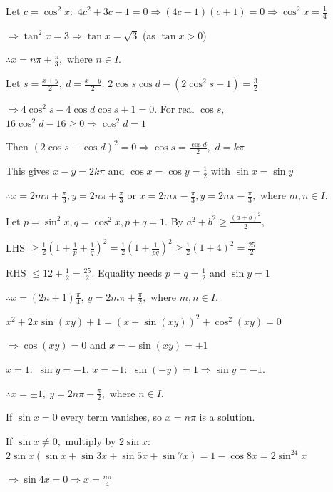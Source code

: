   Let $c = \cos^2x:$ $4c^2 + 3c - 1 = 0 \Rightarrow (4c - 1)(c + 1) = 0 \Rightarrow \cos^2x = \frac{1}{4}$

  $\Rightarrow \tan^2x = 3 \Rightarrow \tan x = \sqrt{3}$ (as $\tan x > 0$)

  $\therefore x = n\pi + \frac{\pi}{3},$ where $n\in I.$

\item Let $s = \frac{x + y}{2},~d = \frac{x - y}{2}.$ $2\cos s\cos d - (2\cos^2s - 1) = \frac{3}{2}$

  $\Rightarrow 4\cos^2s - 4\cos d\cos s + 1 = 0.$ For real $\cos s,$ $16\cos^2d - 16\geq 0\Rightarrow \cos^2d = 1$

  Then $(2\cos s - \cos d)^2 = 0 \Rightarrow \cos s = \frac{\cos d}{2},$ $d = k\pi$

  This gives $x - y = 2k\pi$ and $\cos x = \cos y = \frac{1}{2}$ with $\sin x = \sin y$

  $\therefore x = 2m\pi + \frac{\pi}{3}, y = 2n\pi + \frac{\pi}{3}$ or $x = 2m\pi - \frac{\pi}{3}, y = 2n\pi -
  \frac{\pi}{3},$ where $m, n\in I.$

\item Let $p = \sin^2x, q = \cos^2x, p + q = 1.$ By $a^2 + b^2\geq\frac{(a + b)^2}{2},$

  LHS $\geq \frac{1}{2}\left(1 + \frac{1}{p} + \frac{1}{q}\right)^2 = \frac{1}{2}\left(1 + \frac{1}{pq}\right)^2\geq
  \frac{1}{2}(1 + 4)^2 = \frac{25}{2}$

  RHS $\leq 12 + \frac{1}{2} = \frac{25}{2}.$ Equality needs $p = q = \frac{1}{2}$ and $\sin y = 1$

  $\therefore x = (2n + 1)\frac{\pi}{4},~y = 2m\pi + \frac{\pi}{2},$ where $m, n\in I.$

\item $x^2 + 2x\sin(xy) + 1 = (x + \sin(xy))^2 + \cos^2(xy) = 0$

  $\Rightarrow \cos(xy) = 0$ and $x = -\sin(xy) = \pm 1$

  $x = 1:$ $\sin y = -1.$ $x = -1:$ $\sin(-y) = 1\Rightarrow \sin y = -1.$

  $\therefore x = \pm 1,~y = 2n\pi - \frac{\pi}{2},$ where $n\in I.$

\item If $\sin x = 0$ every term vanishes, so $x = n\pi$ is a solution.

  If $\sin x\neq 0,$ multiply by $2\sin x:$ $2\sin x(\sin x + \sin3x + \sin5x + \sin7x) = 1 - \cos8x = 2\sin^24x$

  $\Rightarrow \sin4x = 0 \Rightarrow x = \frac{n\pi}{4}$

